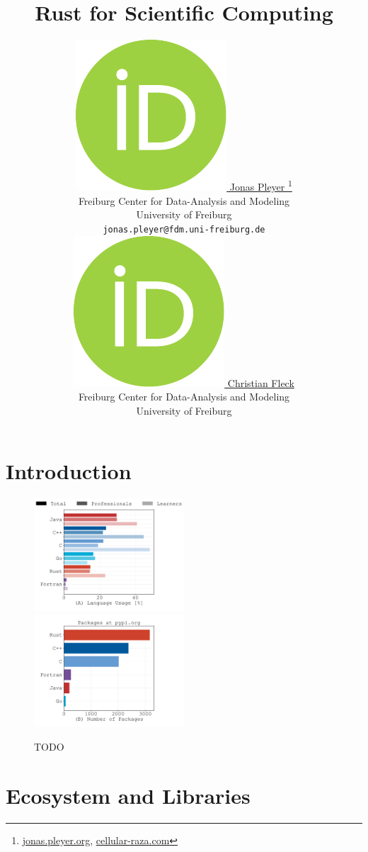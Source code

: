 \documentclass{article}
\title{Rust for Scientific Computing}
\author{
    \href{https://orcid.org/0009-0001-0613-7978}{
        \includegraphics[scale=0.06]{orcid.pdf}
        \hspace{1mm}Jonas Pleyer
    }
    \thanks{
        \href{https://jonas.pleyer.org}{jonas.pleyer.org},
        \href{https://cellular-raza.com}{cellular-raza.com}
    }\\
	Freiburg Center for Data-Analysis and Modeling\\
	University of Freiburg\\
	\texttt{jonas.pleyer@fdm.uni-freiburg.de} \\
	\And
	\href{https://orcid.org/0000-0002-6371-4495}{
        \includegraphics[scale=0.06]{orcid.pdf}
        \hspace{1mm}Christian Fleck
    }\\
	Freiburg Center for Data-Analysis and Modeling\\
	University of Freiburg
}
\begin{document}
\maketitle

\begin{abstract}
\end{abstract}

\pagebreak
\tableofcontents
\pagebreak


\section{Introduction}
\label{section:introduction}

\begin{figure}
    \centering
    \includegraphics[width=0.5\textwidth]{figures/stackoverflow-popular-languages.pdf}%
    \includegraphics[width=0.5\textwidth]{figures/pypi-org-used-languages.pdf}
    \caption{TODO}
\end{figure}

\section{Ecosystem and Libraries}
\end{document}
